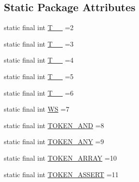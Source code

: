 \subsection*{Static Package Attributes}
\begin{DoxyCompactItemize}
\item 
static final int \hyperlink{classgov_1_1nasa_1_1jpf_1_1inspector_1_1server_1_1expression_1_1parser_1_1_expression_grammar_lexer_ab693abbfa03189c7b47a2c55b5624dfe}{T\+\_\+\+\_} =2
\item 
static final int \hyperlink{classgov_1_1nasa_1_1jpf_1_1inspector_1_1server_1_1expression_1_1parser_1_1_expression_grammar_lexer_a16f2821fb5646518fd00900796a8f8f5}{T\+\_\+\+\_} =3
\item 
static final int \hyperlink{classgov_1_1nasa_1_1jpf_1_1inspector_1_1server_1_1expression_1_1parser_1_1_expression_grammar_lexer_a1abe2aa204f993099f6b45409db47b7b}{T\+\_\+\+\_} =4
\item 
static final int \hyperlink{classgov_1_1nasa_1_1jpf_1_1inspector_1_1server_1_1expression_1_1parser_1_1_expression_grammar_lexer_a72be476fe0db29853dba7d5c27b799ff}{T\+\_\+\+\_} =5
\item 
static final int \hyperlink{classgov_1_1nasa_1_1jpf_1_1inspector_1_1server_1_1expression_1_1parser_1_1_expression_grammar_lexer_ab8a4f23c21c377e0d1d56f430e196e72}{T\+\_\+\+\_} =6
\item 
static final int \hyperlink{classgov_1_1nasa_1_1jpf_1_1inspector_1_1server_1_1expression_1_1parser_1_1_expression_grammar_lexer_abe9eb2f862f31836ed276fb1fb5fe35f}{WS} =7
\item 
static final int \hyperlink{classgov_1_1nasa_1_1jpf_1_1inspector_1_1server_1_1expression_1_1parser_1_1_expression_grammar_lexer_a164f97bd368d6ff54f79369324edfccf}{T\+O\+K\+E\+N\+\_\+\+A\+ND} =8
\item 
static final int \hyperlink{classgov_1_1nasa_1_1jpf_1_1inspector_1_1server_1_1expression_1_1parser_1_1_expression_grammar_lexer_ae7eff4d9199d391e99d8b7bfdcb8598f}{T\+O\+K\+E\+N\+\_\+\+A\+NY} =9
\item 
static final int \hyperlink{classgov_1_1nasa_1_1jpf_1_1inspector_1_1server_1_1expression_1_1parser_1_1_expression_grammar_lexer_a40cf6df6c08cc7e8466d964ed47380d1}{T\+O\+K\+E\+N\+\_\+\+A\+R\+R\+AY} =10
\item 
static final int \hyperlink{classgov_1_1nasa_1_1jpf_1_1inspector_1_1server_1_1expression_1_1parser_1_1_expression_grammar_lexer_a01c19b8cc2995c9e9f2bcac0e4ff9bf9}{T\+O\+K\+E\+N\+\_\+\+A\+S\+S\+E\+RT} =11

\end{DoxyCompactItemize}
